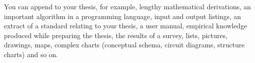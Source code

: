 \documentclass[12pt,a4paper,english
]{tunithesis}
\begin{document}
You can append to your thesis, for example, lengthy mathematical
derivations, an important algorithm in a programming language, input
and output listings, an extract of a standard relating to your thesis,
a user manual, empirical knowledge produced while preparing the
thesis, the results of a survey, lists, pictures, drawings, maps,
complex charts (conceptual schema, circuit diagrams, structure charts)
and so on.


%
\end{document}
